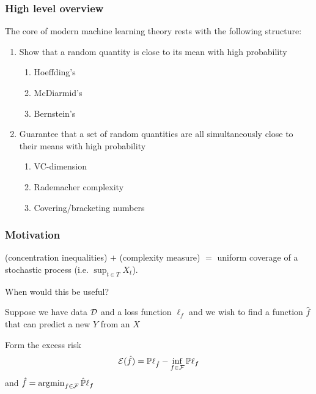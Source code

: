 \documentclass[12pt]{beamer}
\begin{document}
\begin{frame}[fragile]
\frametitle{High level overview}
The core of modern machine learning theory rests with the following structure:

\vsp
\begin{enumerate}
\item {} Show that a random quantity is close to its mean with 
high probability
\begin{enumerate}
\item Hoeffding's
\item McDiarmid's
\item Bernstein's
\end{enumerate}
\item {} Guarantee that a set of random quantities are all simultaneously close 
to their means with high probability
\begin{enumerate}
\item VC-dimension
\item Rademacher complexity
\item Covering/bracketing numbers
\end{enumerate}

\end{enumerate}
\end{frame}
%

\begin{frame}[fragile]
\frametitle{Motivation}
 (concentration inequalities) $+$ (complexity measure) $=$ uniform coverage
of a stochastic process (i.e. $\sup_{t \in T} X_t$). 
\vsp

 When would this be useful?

\vsp
Suppose we have data $\mathcal{D}$ and a loss function $\ell_f$ and we wish to find a function $\hat{f}$ that can predict
a new $Y$ from an $X$

\vsp
Form the excess risk
\[
\mathcal{E}(\hat f) = \mathbb{P}\ell_{\hat{f}} - \inf_{f \in\mathcal{F}} \mathbb{P}\ell_{f}
\]
and $\hat{f} = \operatorname*{\arg\!\min}_{f\in\mathcal{F}} \hat{\mathbb{P}} \ell_f$
\end{frame}
\end{document}
